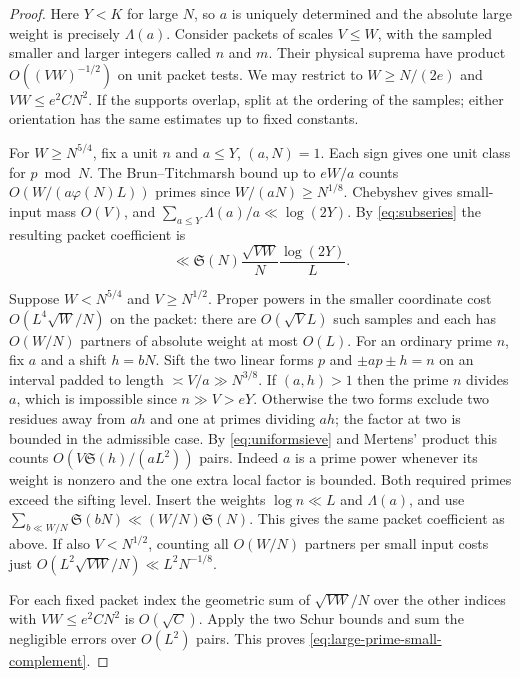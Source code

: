\documentclass[11pt,a4paper]{article}
\numberwithin{equation}{section}
\newcommand{\SSS}{\mathfrak S}
\begin{document}
\begin{proof}
Here $Y<K$ for large $N$, so $a$ is uniquely determined and the
absolute large weight is precisely $\Lambda(a)$. Consider packets
of scales $V\le W$, with the sampled smaller and larger integers
called $n$ and $m$. Their physical suprema have product
$O((VW)^{-1/2})$ on unit packet tests. We may restrict to
$W\ge N/(2e)$ and $VW\le e^2 C N^2$. If the supports overlap,
split at the ordering of the samples; either orientation has
the same estimates up to fixed constants.

For $W\ge N^{5/4}$, fix a unit $n$ and $a\le Y$, $(a,N)=1$.
Each sign gives one unit class for $p\bmod N$. The
Brun--Titchmarsh bound \cite{MontgomeryVaughanSieve} up to
$eW/a$ counts $O(W/(a\varphi(N)L))$ primes since
$W/(aN)\ge N^{1/8}$. Chebyshev gives small-input mass $O(V)$,
and $\sum_{a\le Y}\Lambda(a)/a\ll\log(2Y)$. By
\eqref{eq:subseries} the resulting packet coefficient is
\[
 \ll \SSS(N)\frac{\sqrt{VW}}N\frac{\log(2Y)}L .
\]

Suppose $W<N^{5/4}$ and $V\ge N^{1/2}$. Proper powers in
the smaller coordinate cost $O(L^4\sqrt W/N)$ on the packet:
there are $O(\sqrt V L)$ such samples and each has $O(W/N)$
partners of absolute weight at most $O(L)$. For an ordinary
prime $n$, fix $a$ and a shift $h=bN$. Sift the two linear
forms $p$ and $\pm ap\pm h=n$ on an interval padded to length
$\asymp V/a\gg N^{3/8}$. If $(a,h)>1$ then the prime $n$
divides $a$, which is impossible since $n\gg V>eY$.
Otherwise the two forms exclude two residues away from $ah$
and one at primes dividing $ah$; the factor at two is bounded
in the admissible case. By \eqref{eq:uniformsieve} and Mertens'
product this counts $O(V\SSS(h)/(a L^2))$ pairs. Indeed $a$
is a prime power whenever its weight is nonzero and the one
extra local factor is bounded. Both required primes exceed
the sifting level. Insert the weights $\log n\ll L$ and
$\Lambda(a)$, and use $\sum_{b\ll W/N}\SSS(bN)\ll(W/N)\SSS(N)$.
This gives the same packet coefficient as above.
If also $V<N^{1/2}$, counting all $O(W/N)$ partners per small
input costs just $O(L^2\sqrt{VW}/N)\ll L^2N^{-1/8}$.

For each fixed packet index the geometric sum of $\sqrt{VW}/N$
over the other indices with $VW\le e^2CN^2$ is $O(\sqrt C)$.
Apply the two Schur bounds and sum the negligible errors over
$O(L^2)$ pairs. This proves \eqref{eq:large-prime-small-complement}.
\end{proof}
\end{document}
